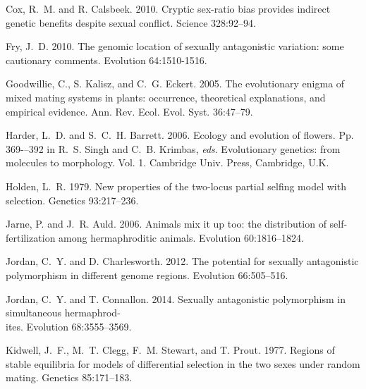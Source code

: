 \documentclass{article}
\begin{document}
\begin{thebibliography}{}
Cox, R.~M. and R. Calsbeek. 2010.
\newblock Cryptic sex-ratio bias provides indirect genetic benefits despite sexual conflict.
\newblock Science 328:92--94.

Fry, J.~D. 2010.
\newblock The genomic location of sexually antagonistic variation: some cautionary comments.
\newblock Evolution 64:1510-1516.

Goodwillie, C., S. Kalisz, and C.~G. Eckert. 2005.
\newblock The evolutionary enigma of mixed mating systems in plants: occurrence, theoretical explanations, and empirical evidence.
\newblock Ann. Rev. Ecol. Evol. Syst. 36:47--79.

Harder, L.~D. and S.~C.~H. Barrett. 2006.
\newblock Ecology and evolution of flowers.
\newblock Pp. 369-–392 in R.~S. Singh and C.~B. Krimbas, \textit{eds}. Evolutionary genetics: from molecules to morphology. Vol. 1. Cambridge Univ. Press, Cambridge, U.K.


Holden, L.~R. 1979.
\newblock New properties of the two-locus partial selfing model with selection.
\newblock Genetics 93:217--236.

Jarne, P. and J.~R. Auld. 2006.
\newblock Animals mix it up too: the distribution of self-fertilization among hermaphroditic animals.
\newblock Evolution 60:1816--1824.

Jordan, C.~Y. and D. Charlesworth. 2012.
\newblock The potential for sexually antagonistic polymorphism in different genome regions.
\newblock Evolution 66:505--516.

Jordan, C.~Y. and T. Connallon. 2014.
\newblock Sexually antagonistic polymorphism in simultaneous hermaphrod-\\ites.
\newblock Evolution 68:3555--3569.

Kidwell, J.~F., M.~T. Clegg, F.~M. Stewart, and T. Prout. 1977.
\newblock Regions of stable equilibria for models of differential selection in the two sexes under random mating.
\newblock Genetics 85:171--183.


\end{thebibliography}
\end{document}
